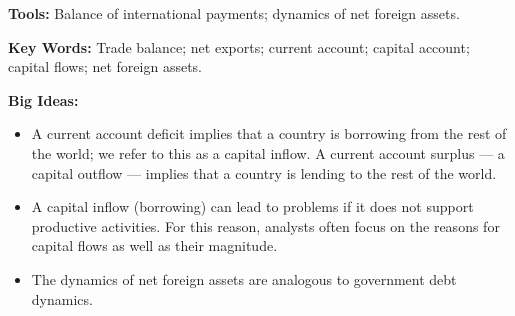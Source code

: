 \textbf{Tools:} Balance of international payments; dynamics of net foreign assets.

\textbf{Key Words:} Trade balance; net exports; current account; capital account; capital flows; net foreign assets.

\textbf{Big Ideas:}
\begin{itemize}
\item A current account deficit implies that a country is borrowing from the rest of the
world; we refer to this as a capital inflow.
A current account surplus --- a capital outflow --- implies that a country is lending to the
rest of the world.
\item
A capital inflow (borrowing) can lead to problems if
it does not support productive activities.
For this reason, analysts often focus on the reasons for capital flows as well as their magnitude.

\item The dynamics of net foreign assets are analogous to government debt dynamics.
\end{itemize}
